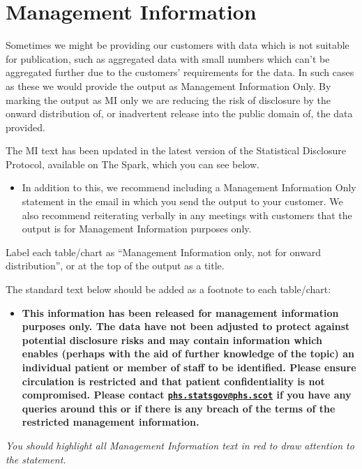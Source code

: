 \documentclass[
]{book}
\providecommand{\tightlist}{%
  \setlength{\itemsep}{0pt}\setlength{\parskip}{0pt}}
\begin{document}
\hypertarget{managementinformation}{%
\section{Management Information}\label{managementinformation}}

Sometimes we might be providing our customers with data which is not suitable for publication, such as aggregated data with small numbers which can't be aggregated further due to the customers' requirements for the data. In such cases as these we would provide the output as Management Information Only. By marking the output as MI only we are reducing the risk of disclosure by the onward distribution of, or inadvertent release into the public domain of, the data provided.

The MI text has been updated in the latest version of the Statistical Disclosure Protocol, available on The Spark, which you can see below.

\begin{itemize}
\tightlist
\item
  In addition to this, we recommend including a Management Information Only statement in the email in which you send the output to your customer. We also recommend reiterating verbally in any meetings with customers that the output is for Management Information purposes only.
\end{itemize}

Label each table/chart as ``Management Information only, not for onward distribution'', or at the top of the output as a title.

The standard text below should be added as a footnote to each table/chart:

\begin{itemize}
\tightlist
\item
  \textbf{This information has been released for management information purposes only. The data have not been adjusted to protect against potential disclosure risks and may contain information which enables (perhaps with the aid of further knowledge of the topic) an individual patient or member of staff to be identified. Please ensure circulation is restricted and that patient confidentiality is not compromised. Please contact \href{mailto:phs.statsgov@phs.scot}{\nolinkurl{phs.statsgov@phs.scot}} if you have any queries around this or if there is any breach of the terms of the restricted management information.}
\end{itemize}

\emph{You should highlight all Management Information text in red to draw attention to the statement.}
\end{document}
